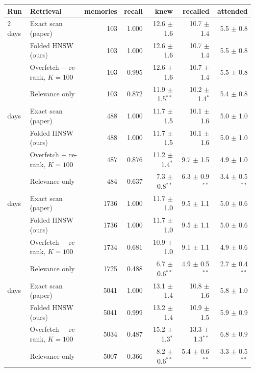 \begin{tabular}{l l r r r r r}
\toprule
Run & Retrieval & memories & recall & knew & recalled & attended\\
\midrule
2 days & Exact scan (paper) & 103 & 1.000 & 12.6 $\pm$ 1.6 & 10.7 $\pm$ 1.4 & 5.5 $\pm$ 0.8\\
 & Folded HNSW (ours) & 103 & 1.000 & 12.6 $\pm$ 1.6 & 10.7 $\pm$ 1.4 & 5.5 $\pm$ 0.8\\
 & Overfetch + re-rank, $K{=}100$ & 103 & 0.995 & 12.6 $\pm$ 1.6 & 10.7 $\pm$ 1.4 & 5.5 $\pm$ 0.8\\
 & Relevance only & 103 & 0.872 & 11.9 $\pm$ 1.5$^{**}$ & 10.2 $\pm$ 1.4$^{*}$ & 5.4 $\pm$ 0.8\\
\addlinespace
9 days & Exact scan (paper) & 488 & 1.000 & 11.7 $\pm$ 1.5 & 10.1 $\pm$ 1.6 & 5.0 $\pm$ 1.0\\
 & Folded HNSW (ours) & 488 & 1.000 & 11.7 $\pm$ 1.5 & 10.1 $\pm$ 1.6 & 5.0 $\pm$ 1.0\\
 & Overfetch + re-rank, $K{=}100$ & 487 & 0.876 & 11.2 $\pm$ 1.4$^{*}$ & 9.7 $\pm$ 1.5 & 4.9 $\pm$ 1.0\\
 & Relevance only & 484 & 0.637 & 7.3 $\pm$ 0.8$^{**}$ & 6.3 $\pm$ 0.9$^{**}$ & 3.4 $\pm$ 0.5$^{**}$\\
\addlinespace
32 days & Exact scan (paper) & 1736 & 1.000 & 11.7 $\pm$ 1.0 & 9.5 $\pm$ 1.1 & 5.0 $\pm$ 0.6\\
 & Folded HNSW (ours) & 1736 & 1.000 & 11.7 $\pm$ 1.0 & 9.5 $\pm$ 1.1 & 5.0 $\pm$ 0.6\\
 & Overfetch + re-rank, $K{=}100$ & 1734 & 0.681 & 10.9 $\pm$ 1.0 & 9.1 $\pm$ 1.1 & 4.9 $\pm$ 0.6\\
 & Relevance only & 1725 & 0.488 & 6.7 $\pm$ 0.6$^{**}$ & 4.9 $\pm$ 0.5$^{**}$ & 2.7 $\pm$ 0.4$^{**}$\\
\addlinespace
92 days & Exact scan (paper) & 5041 & 1.000 & 13.1 $\pm$ 1.4 & 10.8 $\pm$ 1.6 & 5.8 $\pm$ 1.0\\
 & Folded HNSW (ours) & 5041 & 0.999 & 13.2 $\pm$ 1.4 & 10.9 $\pm$ 1.5 & 5.9 $\pm$ 0.9\\
 & Overfetch + re-rank, $K{=}100$ & 5034 & 0.487 & 15.2 $\pm$ 1.3$^{*}$ & 13.3 $\pm$ 1.3$^{**}$ & 6.8 $\pm$ 0.9\\
 & Relevance only & 5007 & 0.366 & 8.2 $\pm$ 0.6$^{**}$ & 5.4 $\pm$ 0.6$^{**}$ & 3.3 $\pm$ 0.5$^{**}$\\
\bottomrule
\end{tabular}
